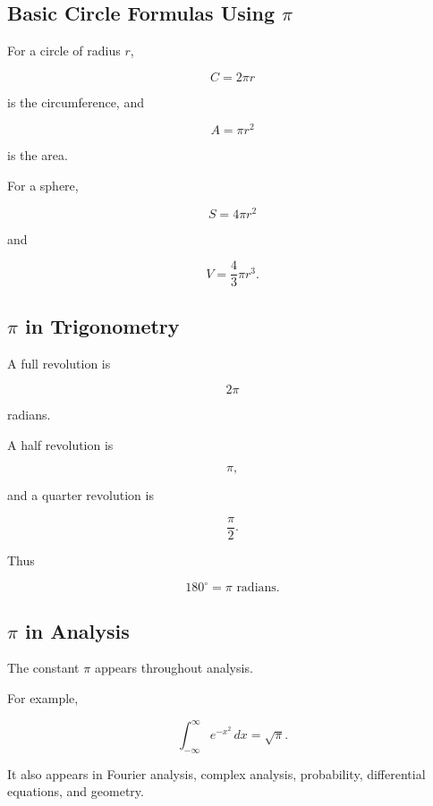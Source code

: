 \subsection{Basic Circle Formulas Using \(\pi\)}
\label{subsec:pi-circle-formulas}

For a circle of radius \(r\),

\[
\boxed{
C
=
2\pi r
}
\]

is the circumference, and

\[
\boxed{
A
=
\pi r^2
}
\]

is the area.

For a sphere,

\[
\boxed{
S
=
4\pi r^2
}
\]

and

\[
\boxed{
V
=
\frac43\pi r^3.
}
\]

\subsection{\(\pi\) in Trigonometry}
\label{subsec:pi-trigonometry}

A full revolution is

\[
\boxed{
2\pi
}
\]

radians.

A half revolution is

\[
\boxed{
\pi,
}
\]

and a quarter revolution is

\[
\boxed{
\frac{\pi}{2}.
}
\]

Thus

\[
\boxed{
180^\circ
=
\pi\text{ radians}.
}
\]

\subsection{\(\pi\) in Analysis}
\label{subsec:pi-analysis}

The constant \(\pi\) appears throughout analysis.

For example,

\[
\boxed{
\int_{-\infty}^{\infty}
e^{-x^2}\,dx
=
\sqrt{\pi}.
}
\]

It also appears in Fourier analysis, complex analysis, probability,
differential equations, and geometry.

